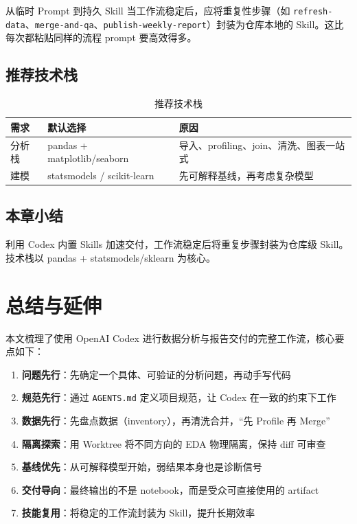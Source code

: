 \documentclass[a4paper]{article}
\begin{document}
\begin{knowledgebox}{从临时 Prompt 到持久 Skill}
当工作流稳定后，应将重复性步骤（如 \texttt{refresh-data}、\texttt{merge-and-qa}、\texttt{publish-weekly-report}）封装为仓库本地的 Skill。这比每次都粘贴同样的流程 prompt 要高效得多。
\end{knowledgebox}

\subsection{推荐技术栈}

\begin{table}[H]
\centering
\begin{tabular}{lll}
\toprule
\textbf{需求} & \textbf{默认选择} & \textbf{原因} \\
\midrule
分析栈 & pandas + matplotlib/seaborn & 导入、profiling、join、清洗、图表一站式 \\
建模 & statsmodels / scikit-learn & 先可解释基线，再考虑复杂模型 \\
\bottomrule
\end{tabular}
\caption{推荐技术栈}
\end{table}

\subsection{本章小结}
利用 Codex 内置 Skills 加速交付，工作流稳定后将重复步骤封装为仓库级 Skill。技术栈以 pandas + statsmodels/sklearn 为核心。

\section{总结与延伸}

本文梳理了使用 OpenAI Codex 进行数据分析与报告交付的完整工作流，核心要点如下：

\begin{enumerate}
    \item \textbf{问题先行}：先确定一个具体、可验证的分析问题，再动手写代码
    \item \textbf{规范先行}：通过 \texttt{AGENTS.md} 定义项目规范，让 Codex 在一致的约束下工作
    \item \textbf{数据先行}：先盘点数据（inventory），再清洗合并，``先 Profile 再 Merge''
    \item \textbf{隔离探索}：用 Worktree 将不同方向的 EDA 物理隔离，保持 diff 可审查
    \item \textbf{基线优先}：从可解释模型开始，弱结果本身也是诊断信号
    \item \textbf{交付导向}：最终输出的不是 notebook，而是受众可直接使用的 artifact
    \item \textbf{技能复用}：将稳定的工作流封装为 Skill，提升长期效率
\end{enumerate}
\end{document}
